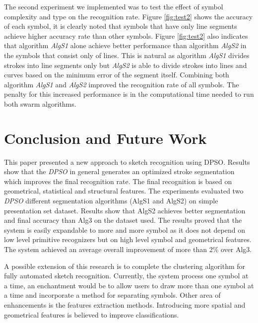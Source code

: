 \documentclass{article}
\begin{document}
The second experiment we implemented was to test the effect of symbol complexity and type on the recognition rate. Figure \ref{fig:test2} shows the accuracy of each symbol, it is clearly noted that symbols that have only line segments achieve higher accuracy rate than other symbols. Figure \ref{fig:test2} also indicates that algorithm \textsl{AlgS1} alone achieve better performance than algorithm \textsl{AlgS2} in the symbols that consist only of lines. This is natural as algorithm \textsl{AlgS1} divides strokes into line segments only but \textsl{AlgS2} is able to divide strokes into lines and curves based on the minimum error of the segment itself. Combining both algorithm \textsl{AlgS1} and \textsl{AlgS2} improved the recognition rate of all symbols. The penalty for this increased performance is in the computational time needed to run both swarm algorithms. 
 
\section{Conclusion and Future Work}
\label{ConclusionandFutureWork}
This paper presented a new approach to sketch recognition using DPSO. Results show that the \textit{DPSO} in general generates an optimized stroke segmentation which improves the final recognition rate.  The final recognition is based on geometrical, statistical and structural features. The experiments evaluated two \textit{DPSO} different segmentation algorithms (AlgS1 and AlgS2) on simple presentation set dataset. Results show that AlgS2 achieves better segmentation and final accuracy than Alg3 \cite{earlyprocess} on the dataset used. The results proved that the system is easily expandable to more and more symbol as it does not depend on low level primitive recognizers but on high level symbol and geometrical features.  The system achieved an average overall improvement of more than 2\% over Alg3.  

 A possible extension of this research is to complete the clustering algorithm for fully automated sketch recognition. Currently, the system process one symbol at a time, an enchantment would be to allow users to draw more than one symbol at a time and incorporate a method for separating symbols. Other area of enhancements is the features extraction methods. Introducing more spatial and geometrical features is believed to improve classifications.  
 


\end{document}
